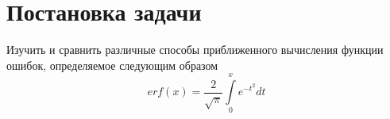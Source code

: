 \section{Постановка задачи} Изучить и сравнить различные способы приближенного вычисления функции ошибок, определяемое следующим образом
$$
	erf(x) = \frac{2}{\sqrt{\pi}} \int \limits_0^x e^{-t^2}dt
$$